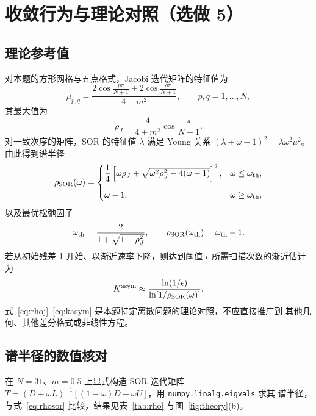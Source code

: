 \documentclass[UTF8,fontset=windows,a4paper,11pt]{ctexart}
\begin{document}
\section{收敛行为与理论对照（选做 5）}
\label{sec:theory}

\subsection{理论参考值}

对本题的方形网格与五点格式，Jacobi 迭代矩阵的特征值为
\begin{equation}
\mu_{p,q}=\frac{2\cos\frac{p\pi}{N+1}+2\cos\frac{q\pi}{N+1}}{4+m^2},
\qquad p,q=1,\ldots,N,
\label{eq:mu}
\end{equation}
其最大值为
\begin{equation}
\rho_J=\frac{4}{4+m^2}\cos\frac{\pi}{N+1}.
\label{eq:rhoj}
\end{equation}
对一致次序的矩阵，SOR 的特征值 $\lambda$ 满足 Young 关系
$(\lambda+\omega-1)^2=\lambda\omega^2\mu^2$。由此得到谱半径
\begin{equation}
\rho_{\rm SOR}(\omega)=
\begin{cases}
\dfrac{1}{4}\left[\omega\rho_J+\sqrt{\omega^2\rho_J^2-4(\omega-1)}\right]^2,
& \omega\le\omega_{\rm th},\\[1.1em]
\omega-1, & \omega\ge\omega_{\rm th},
\end{cases}
\label{eq:rhosor}
\end{equation}
以及最优松弛因子
\begin{equation}
\omega_{\rm th}=\frac{2}{1+\sqrt{1-\rho_J^2}},
\qquad
\rho_{\rm SOR}(\omega_{\rm th})=\omega_{\rm th}-1 .
\label{eq:wth}
\end{equation}
若从初始残差 1 开始、以渐近速率下降，则达到阈值 $\epsilon$ 所需扫描次数的渐近估计为
\begin{equation}
K^{\rm asym}\approx\frac{\ln(1/\epsilon)}{\ln[1/\rho_{\rm SOR}(\omega)]}.
\label{eq:kasym}
\end{equation}
式~\eqref{eq:rhoj}--\eqref{eq:kasym} 是本题特定离散问题的理论对照，不应直接推广到
其他几何、其他差分格式或非线性方程。

\subsection{谱半径的数值核对}

在 $N=31$、$m=0.5$ 上显式构造 SOR 迭代矩阵
$T=(D+\omega L)^{-1}[(1-\omega)D-\omega U]$，用 \texttt{numpy.linalg.eigvals} 求其
谱半径，与式~\eqref{eq:rhosor} 比较，结果见表~\ref{tab:rho} 与图~\ref{fig:theory}(b)。
\end{document}

